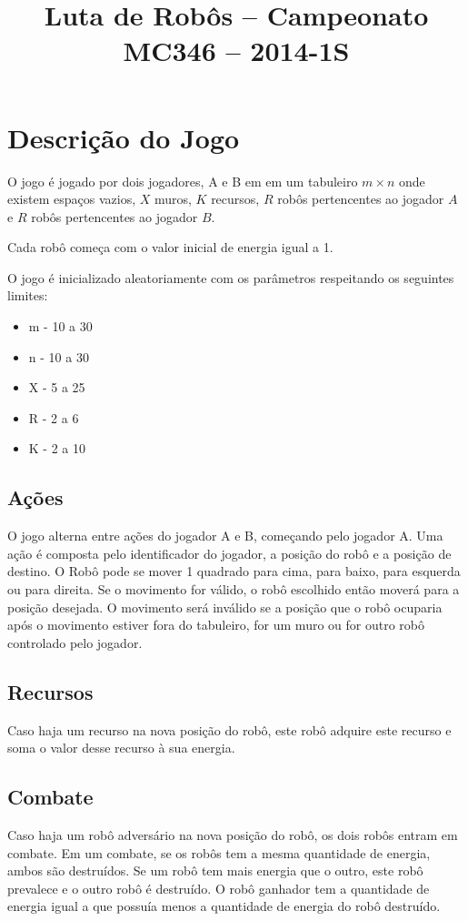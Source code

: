\documentclass[a4paper,11pt]{article}
\title{\textbf{Luta de Robôs -- Campeonato MC346 -- 2014-1S}}
\date{}
\begin{document}
\maketitle

\section{Descrição do Jogo}

O jogo é jogado por dois jogadores, A e B em em um tabuleiro $m \times n$ onde existem espaços vazios, $X$ muros, $K$ recursos, $R$ robôs pertencentes ao jogador $A$ e $R$ robôs pertencentes ao jogador $B$.

Cada robô começa com o valor inicial de energia igual a 1.

O jogo é inicializado aleatoriamente com os parâmetros respeitando os seguintes limites:
\begin{itemize}
\item{m - 10 a 30}
\item{n - 10 a 30}
\item{X - 5 a 25}
\item{R - 2 a 6}
\item{K - 2 a 10}
\end{itemize}

\subsection{Ações}
O jogo alterna entre ações do jogador A e B, começando pelo jogador A. Uma ação é composta pelo identificador do jogador, a posição do robô e a posição de destino. O Robô pode se mover 1 quadrado para cima, para baixo, para esquerda ou para direita. Se o movimento for válido, o robô escolhido então moverá para a posição desejada. O movimento será inválido se a posição que o robô ocuparia após o movimento estiver fora do tabuleiro, for um muro ou for outro robô controlado pelo jogador.

\subsection{Recursos}
Caso haja um recurso na nova posição do robô, este robô adquire este recurso e soma o valor desse recurso à sua energia.

\subsection{Combate}
Caso haja um robô adversário na nova posição do robô, os dois robôs entram em combate. Em um combate, se os robôs tem a mesma quantidade de energia, ambos são destruídos. Se um robô tem mais energia que o outro, este robô prevalece e o outro robô é destruído. O robô ganhador tem a quantidade de energia igual a que possuía menos a quantidade de energia do robô destruído.
\end{document}
